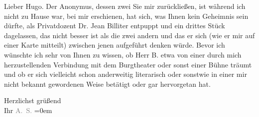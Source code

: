 \pstart{}Lieber Hugo.\pend\vspace{0.5em}
\pstart
           Der Anonymus, dessen zwei
                  \label{K_L02256-2v}\label{K_L02256-2}{ }Sie mir zurückließen, ist \label{K_L02256-3v}\label{K_L02256-3} während ich nicht zu Hause war, bei mir erschienen, hat sich, was Ihnen kein
               Geheimnis sein dürfte, als Privatdozent Dr. Jean
                  Billiter entpuppt und ein drittes Stück dagelassen, das nicht besser ist als
               die zwei andern und das er sich (wie er mir auf einer Karte mitteilt) zwischen jenen
               aufgeführt denken würde. Bevor ich \label{K_L02256-4v}\label{K_L02256-4} wünschte ich sehr von Ihnen zu wissen, ob Herr B. etwa von einer durch mich herzustellenden Verbindung mit dem
                  Burgtheater oder sonst einer Bühne träumt und
               ob er sich vielleicht schon anderweitig literarisch oder sonstwie in einer mir nicht
               bekannt gewordenen Weise betätigt oder gar hervorgetan hat.\pend
           
\pstart
           Herzlichst grüßend{\\[\baselineskip]}Ihr \spacefill\mbox{\textcolor{gray}{A. S.}}\pend
           \leftskip=0em{}\endnumbering{}  \newcommand{\dateiname}{L02256}\newcommand{\titel}{Arthur Schnitzler an Hugo von Hofmannsthal, 19. 2. 1917}\newcommand{\editorInnen}{Martin Anton Müller und Gerd-Hermann Susen}
